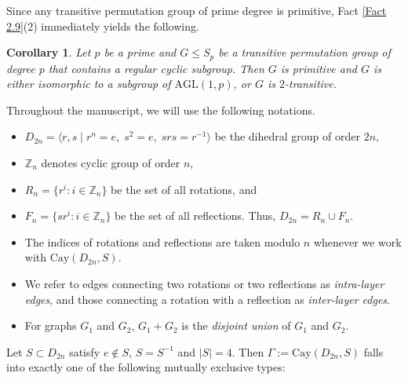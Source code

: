 \documentclass[12pt,reqno,a4paper]{amsart}
\theoremstyle{definition}
\newtheorem{corr}[defn]{Corollary}
\begin{document}
Since any transitive permutation group of prime degree is primitive, Fact \ref{Fact 2.9}(2) immediately yields the following.

\begin{corr}\label{Corollary 2.10}
{\em Let $p$ be a prime and $G\leq S_p$ be a transitive permutation group of degree $p$ that contains a regular cyclic subgroup. Then $G$ is primitive and $G$ is either
isomorphic to a subgroup of $\mathrm{AGL}(1,p)$, or $G$ is $2$-transitive.
}
\end{corr} 

Throughout the manuscript, we will use the following notations.
\begin{itemize}
    \item $D_{2n}=\langle r,s \mid r^n=e, \; s^2=e, \; srs=r^{-1} \rangle$ be the dihedral group of order $2n$,
    \item $\mathbb{Z}_{n}$ denotes cyclic group of order $n$,
    \item  
    $R_{n} = \{ r^i : i \in \mathbb{Z}_n \}$ be the set of all rotations, and 
    \item $F_{n} = \{ sr^i : i \in \mathbb{Z}_n \}$ be the set of all reflections. Thus, $D_{2n} = R_{n} \cup F_{n}$.
    \item The indices of rotations and reflections are taken modulo $n$ whenever we work with $\mathrm{Cay}(D_{2n}, S)$.
    \item We refer to edges connecting two rotations or two reflections as \emph{intra-layer edges}, and those connecting a rotation with a reflection as \emph{inter-layer edges}.

    \item For graphs $G_1$ and $G_2$,
$G_1 + G_2$ is the 
\emph{disjoint union} of $G_1$ and $G_2$.
\end{itemize}
Let $S \subset D_{2n}$ satisfy $e \notin S$, $S=S^{-1}$ and $|S|=4$. 
Then $\Gamma := \mathrm{Cay}(D_{2n}, S)$
falls into exactly one of the following mutually exclusive types:
\end{document}
